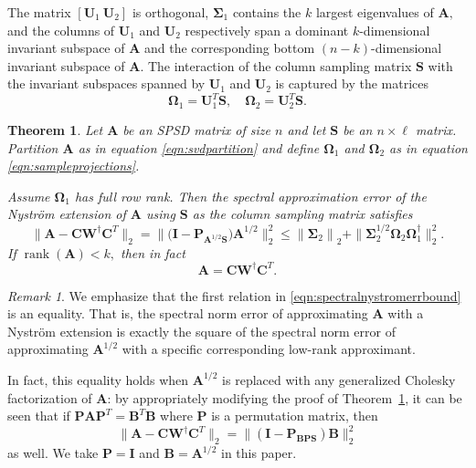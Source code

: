 \documentclass[11pt,letterpaper,twoside,reqno,nosumlimits]{amsart}
\def\pinv{\dagger}
\def\transp{T}
\newcommand{\mat}[1]{\ensuremath{\mathbf{#1}}}
\newcommand{\norm}[1]{\ensuremath{\big\|#1\big\|}}
\newcommand{\snorm}[1]{\ensuremath{\big\|#1\big\|_2}}
\newcommand{\snorms}[1]{\ensuremath{\big\|#1\big\|_2^2}}
\DeclareMathOperator{\rank}{rank}
\newtheorem{thm}{Theorem}
\theoremstyle{remark}
\newtheorem{remark}{Remark}
\begin{document}
The matrix $[\mat{U}_1\  \mat{U}_2]$ is orthogonal, $\mat{\Sigma}_1$ contains the $k$ largest eigenvalues of $\mat{A},$ and the columns of $\mat{U}_1$ and $\mat{U}_2$ respectively span a dominant $k$-dimensional invariant subspace of $\mat{A}$ and the corresponding bottom $(n-k)$-dimensional invariant subspace of $\mat{A}.$ The interaction of the column sampling matrix $\mat{S}$ with the invariant subspaces spanned by $\mat{U}_1$ and $\mat{U}_2$ is captured by the matrices
\begin{equation}
 \mat{\Omega}_1 = \mat{U}_1^\transp \mat{S}, \quad \mat{\Omega}_2 = \mat{U}_2^\transp \mat{S}.
\label{eqn:sampleprojections}
\end{equation}

\begin{thm}
Let $\mat{A}$ be an SPSD matrix of size $n$ and let $\mat{S}$ be an $n \times \ell$ matrix. Partition $\mat{A}$ as in equation \eqref{eqn:svdpartition} and define $\mat{\Omega}_1$ and $\mat{\Omega}_2$ as in equation \eqref{eqn:sampleprojections}.

Assume $\mat{\Omega}_1$ has full row rank. Then the spectral approximation error of the Nystr\"om extension of $\mat{A}$ using $\mat{S}$ as the column sampling matrix satisfies
\begin{equation}
\|\mat{A} - \mat{C}\mat{W}^\pinv \mat{C}^\transp\|_2 = \|\big(\mat{I} - \mat{P}_{\mat{A}^{1/2} \mat{S}}\big)\mat{A}^{1/2}\|_2^2 \leq \norm{\mat{\Sigma}_2}_2 + \|\mat{\Sigma}_2^{1/2} \mat{\Omega}_2 \mat{\Omega}_1^\pinv\|_2^2.
  \label{eqn:spectralnystromerrbound}
\end{equation}
If $\rank(\mat{A}) < k,$ then in fact
\[
 \mat{A} = \mat{C}\mat{W}^\pinv \mat{C}^\transp.
\]
\label{thm:colselection}
\end{thm}



\begin{remark}
We emphasize that the first relation in \eqref{eqn:spectralnystromerrbound} is an equality. That is, the spectral norm error of approximating $\mat{A}$ with a Nystr\"om extension is exactly the square of the spectral norm error of approximating $\mat{A}^{1/2}$ with a specific corresponding low-rank approximant. 

In fact, this equality holds when $\mat{A}^{1/2}$ is replaced with any generalized Cholesky factorization of $\mat{A}$: by appropriately modifying the proof of Theorem~\ref{thm:colselection}, it can be seen that if $\mat{P} \mat{A} \mat{P}^\transp = \mat{B}^\transp \mat{B}$ where $\mat{P}$ is a permutation matrix, then 
\[
 \snorm{\mat{A} - \mat{C}\mat{W}^\pinv \mat{C}^\transp} = \snorms{(\mat{I} - \mat{P}_{\mat{B}\mat{P}\mat{S}})\mat{B}}
\]
as well. We take $\mat{P} = \mat{I}$ and $\mat{B} = \mat{A}^{1/2}$ in this paper.
\end{remark}
\end{document}
